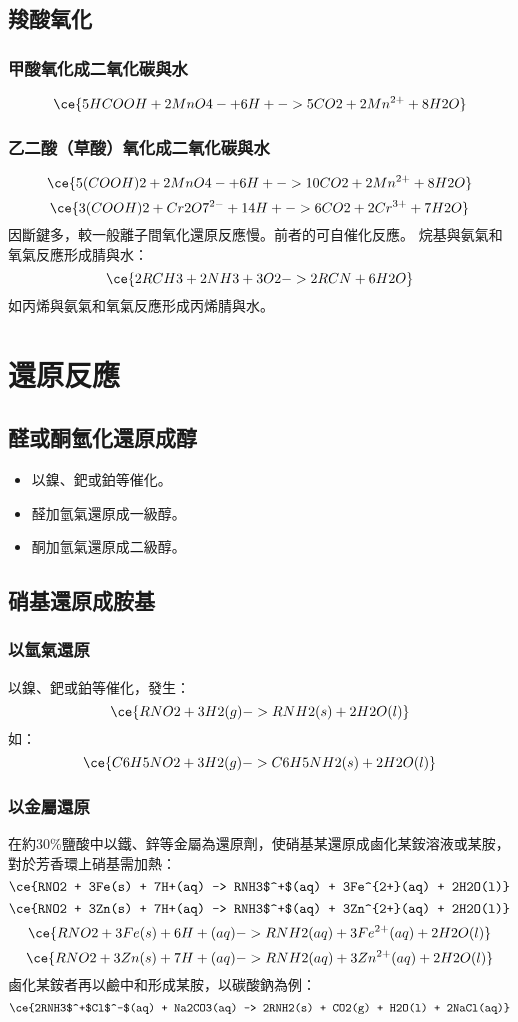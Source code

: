 \documentclass[a4paper,12pt]{report}
\begin{document}
\begin{itemize}
\subsection{羧酸氧化}
\subsubsection{甲酸氧化成二氧化碳與水}
\[\ce{5HCOOH + 2MnO4- + 6H+ -> 5CO2 + 2Mn^{2+} + 8H2O}\]
\subsubsection{乙二酸（草酸）氧化成二氧化碳與水}
\[\ce{5(COOH)2 + 2MnO4- + 6H+ -> 10CO2 + 2Mn^{2+} + 8H2O}\]
\[\ce{3(COOH)2 + Cr2O7^{2-} + 14H+ -> 6CO2 + 2Cr^{3+} + 7H2O}\]
因斷鍵多，較一般離子間氧化還原反應慢。前者的可自催化反應。
烷基與氨氣和氧氣反應形成腈與水：
\[\ce{2RCH3 + 2NH3 + 3O2 -> 2RCN + 6H2O}\]
如丙烯與氨氣和氧氣反應形成丙烯腈與水。


\section{還原反應}
\subsection{醛或酮氫化還原成醇}
\begin{itemize}
\item 以鎳、鈀或鉑等催化。
\item 醛加氫氣還原成一級醇。
\item 酮加氫氣還原成二級醇。
\end{itemize}
\subsection{硝基還原成胺基}
\subsubsection{以氫氣還原}
以鎳、鈀或鉑等催化，發生：
\[\ce{RNO2 + 3H2(g) -> RNH2(s) + 2H2O(l)}\]
如：
\[\ce{C6H5NO2 + 3H2(g) -> C6H5NH2(s) + 2H2O(l)}\]
\subsubsection{以金屬還原}
在約30\%鹽酸中以鐵、鋅等金屬為還原劑，使硝基某還原成鹵化某銨溶液或某胺，對於芳香環上硝基需加熱：
\[\ce{RNO2 + 3Fe(s) + 7H+(aq) -> RNH3$^+$(aq) + 3Fe^{2+}(aq) + 2H2O(l)}\]
\[\ce{RNO2 + 3Zn(s) + 7H+(aq) -> RNH3$^+$(aq) + 3Zn^{2+}(aq) + 2H2O(l)}\]
\[\ce{RNO2 + 3Fe(s) + 6H+(aq) -> RNH2(aq) + 3Fe^{2+}(aq) + 2H2O(l)}\]
\[\ce{RNO2 + 3Zn(s) + 7H+(aq) -> RNH2(aq) + 3Zn^{2+}(aq) + 2H2O(l)}\]
鹵化某銨者再以鹼中和形成某胺，以碳酸鈉為例：
\[\ce{2RNH3$^+$Cl$^-$(aq) + Na2CO3(aq) -> 2RNH2(s) + CO2(g) + H2O(l) + 2NaCl(aq)}\]



\end{itemize}
\end{document}

